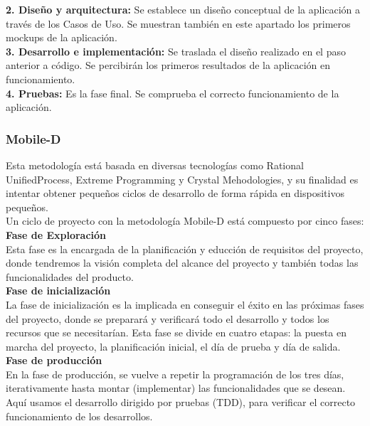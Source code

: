 \documentclass[10pt]{article}
\begin{document}
\textbf{2. Diseño y arquitectura:} Se establece un diseño conceptual de la aplicación a través de los Casos de Uso. Se muestran también en este apartado los primeros mockups de la aplicación.\\

\textbf{3. Desarrollo e implementación:} Se traslada el diseño realizado en el paso anterior a código. Se percibirán los primeros resultados de la aplicación en funcionamiento.\\

\textbf{4. Pruebas:} Es la fase final. Se comprueba el correcto funcionamiento de la aplicación.

\subsubsection{Mobile-D}

Esta metodología está basada en diversas tecnologías como Rational UnifiedProcess, Extreme Programming y Crystal Mehodologies, y su finalidad es intentar obtener pequeños ciclos de desarrollo de forma rápida en dispositivos pequeños. \\

Un ciclo de proyecto con la metodología Mobile-D está compuesto por cinco fases:\\

\textbf{Fase de Exploración}\\

Esta fase es la encargada de la planificación y educción de requisitos del proyecto, donde tendremos la visión completa del alcance del proyecto y también todas las funcionalidades del producto.  \\

\textbf{Fase de inicialización}\\

La fase de inicialización es la implicada en conseguir el éxito en las próximas fases del proyecto, donde se preparará y verificará todo el desarrollo y todos los recursos que se necesitarían. Esta fase se divide en cuatro etapas: la puesta en marcha del proyecto, la planificación inicial, el día de prueba y día de salida.\\

\textbf{Fase de producción}\\

En la fase de producción, se vuelve a repetir la programación de los tres días, iterativamente hasta montar (implementar) las funcionalidades que se desean. Aquí usamos el desarrollo dirigido por pruebas (TDD), para verificar el correcto funcionamiento de los desarrollos. \\
\end{document}
